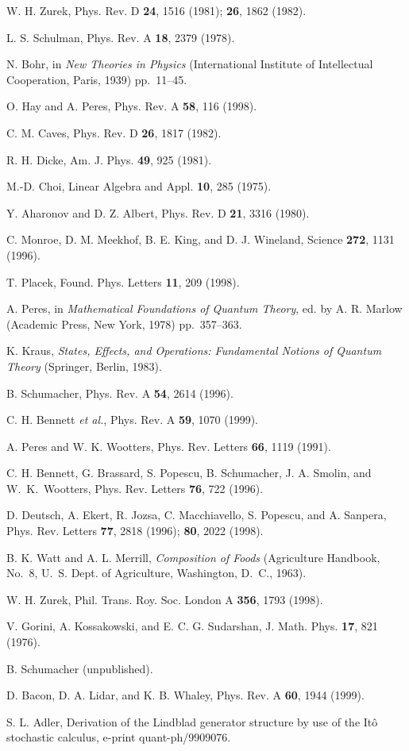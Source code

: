 \documentclass[12pt]{article}
\begin{document}
\begin{thebibliography}{99}
 W. H. Zurek, Phys. Rev. D {\bf24}, 1516 (1981);
{\bf26}, 1862 (1982).

 L. S. Schulman, Phys. Rev. A {\bf18}, 2379 (1978).

 N. Bohr, in {\it New Theories in Physics\/}
(International Institute of Intellectual Cooperation, Paris, 1939)
pp.~11--45.

 O. Hay and A. Peres, Phys. Rev. A {\bf 58}, 116 (1998).

 C. M. Caves, Phys. Rev. D {\bf 26}, 1817 (1982).

 R. H. Dicke, Am. J. Phys. {\bf49}, 925 (1981).

 M.-D. Choi, Linear Algebra and Appl. {\bf10}, 285 (1975).

 Y. Aharonov and D. Z. Albert, Phys. Rev. D {\bf21}, 3316
(1980).

 C. Monroe, D. M. Meekhof, B. E. King, and D. J.
Wineland, Science {\bf272}, 1131 (1996).

 T. Placek, Found. Phys. Letters {\bf11}, 209 (1998).

 A. Peres, in {\it Mathematical Foundations of Quantum
Theory\/}, ed. by A. R. Marlow (Academic Press, New York, 1978)
pp.~357--363.

 K. Kraus, {\it States, Effects, and Operations:
Fundamental Notions of Quantum Theory\/} (Springer, Berlin, 1983).

 B. Schumacher, Phys. Rev. A {\bf54}, 2614 (1996).

 C. H. Bennett {\it et al.\/},  Phys. Rev. A {\bf 59}, 1070
(1999).

 A. Peres and W. K. Wootters, Phys. Rev. Letters {\bf66},
1119 (1991).

 C. H. Bennett, G. Brassard, S. Popescu, B. Schumacher,
J. A. Smolin, and W.~K.~Wootters, Phys. Rev. Letters {\bf76}, 722
(1996).

 D. Deutsch, A. Ekert, R. Jozsa, C. Macchiavello, S.
Popescu, and A. Sanpera, Phys. Rev. Letters {\bf77}, 2818 (1996);
{\bf80}, 2022 (1998).

 B. K. Watt and A. L. Merrill, {\it Composition of
Foods\/} (Agriculture Handbook, No.~8, U.~S. Dept. of Agriculture,
Washington, D.~C., 1963).

 W. H. Zurek, Phil. Trans. Roy. Soc. London A {\bf356},
1793 (1998).

 V. Gorini, A. Kossakowski, and E. C. G. Sudarshan, J.
Math. Phys. {\bf17}, 821 (1976).

 B. Schumacher (unpublished).

 D. Bacon, D. A. Lidar, and K. B. Whaley, Phys. Rev. A
{\bf60}, 1944 (1999).
 
 S. L. Adler, Derivation of the Lindblad generator
structure by use of the It\^o stochastic calculus, e-print
quant-ph/9909076.

\end{thebibliography}
\end{document}
